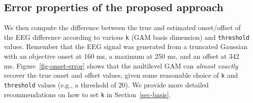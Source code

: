 \documentclass[
  doc,
  floatsintext,
  longtable,
  a4paper,
  nolmodern,
  notxfonts,
  notimes,
  colorlinks=true,linkcolor=blue,citecolor=blue,urlcolor=blue]{apa7}
\newenvironment{Shaded}{\begin{snugshade}}{\end{snugshade}}
\newcommand{\AttributeTok}[1]{\textcolor[rgb]{0.40,0.45,0.13}{#1}}
\newcommand{\CommentTok}[1]{\textcolor[rgb]{0.37,0.37,0.37}{#1}}
\newcommand{\DecValTok}[1]{\textcolor[rgb]{0.68,0.00,0.00}{#1}}
\newcommand{\FloatTok}[1]{\textcolor[rgb]{0.68,0.00,0.00}{#1}}
\newcommand{\FunctionTok}[1]{\textcolor[rgb]{0.28,0.35,0.67}{#1}}
\newcommand{\NormalTok}[1]{\textcolor[rgb]{0.00,0.23,0.31}{#1}}
\newcommand{\OtherTok}[1]{\textcolor[rgb]{0.00,0.23,0.31}{#1}}
\newcommand{\SpecialCharTok}[1]{\textcolor[rgb]{0.37,0.37,0.37}{#1}}
\newcommand{\StringTok}[1]{\textcolor[rgb]{0.13,0.47,0.30}{#1}}
\begin{document}
\begin{Shaded}
\end{Shaded}

\subsection{Error properties of the proposed
approach}\label{error-properties-of-the-proposed-approach}

We then compute the difference between the true and estimated
onset/offset of the EEG difference according to various \texttt{k} (GAM
basis dimension) and \texttt{threshold} values. Remember that the EEG
signal was generated from a truncated Gaussian with an objective onset
at 160 ms, a maximum at 250 ms, and an offset at 342 ms.
Figure~\ref{fig-onset-error} shows that the multilevel GAM can
\emph{almost exactly} recover the true onset and offset values, given
some reasonable choice of \texttt{k} and \texttt{threshold} values
(e.g., a threshold of 20). We provide more detailed recommendations on
how to set \texttt{k} in Section~\ref{sec-basis}.
\end{document}
